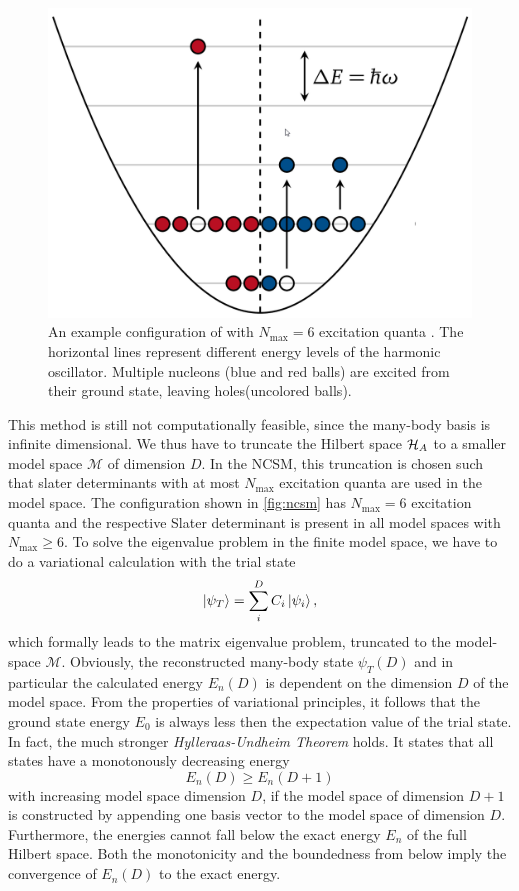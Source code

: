 \begin{figure}
  \includegraphics[width=.4\textwidth]{media/ncsm.png}
  \caption{An example configuration of  with $N_\mathrm{max} = 6$ excitation quanta \cite{sommerschule}. The horizontal lines represent different energy levels of the harmonic oscillator. Multiple nucleons (blue and red balls) are excited from their ground state, leaving holes(uncolored balls).}
  \label{fig:ncsm}
\end{figure}
This method is still not computationally feasible, since the many-body basis is infinite dimensional. We thus have to truncate the Hilbert space $\mathcal{H}_A$ to a smaller model space $\mathcal{M}$ of dimension $D$. In the NCSM, this truncation is chosen such that slater determinants with at most $N_\mathrm{max}$ excitation quanta are used in the model space. The  configuration shown in \autoref{fig:ncsm} has $N_\mathrm{max} = 6$ excitation quanta and the respective Slater determinant is present in all model spaces with $N_\mathrm{max} \geq 6$.
To solve the eigenvalue problem in the finite model space, we have to do a variational calculation with the trial state
\begin{equation}
  \ket{\psi_T} = \sum_i^{D} C_i \ket{\psi_i},
\end{equation}
which formally leads to the matrix eigenvalue problem, truncated to the model-space $\mathcal{M}$. Obviously, the reconstructed many-body state $\psi_T(D)$ and in particular the calculated energy $E_n(D)$ is dependent on the dimension $D$ of the model space. From the properties of variational principles, it follows that the ground state energy $E_0$ is always less then the expectation value of the trial state. In fact, the much stronger \textit{Hylleraas-Undheim Theorem} holds. It states that all states have a monotonously decreasing energy
\begin{equation}
  E_n(D) \geq E_n(D+1)
\end{equation}
with increasing model space dimension $D$, if the model space of dimension $D+1$ is constructed by appending one basis vector to the model space of dimension $D$. Furthermore, the energies cannot fall below the exact energy $E_n$ of the full Hilbert space. Both the monotonicity and the boundedness from below imply the convergence of $E_n(D)$ to the exact energy.

